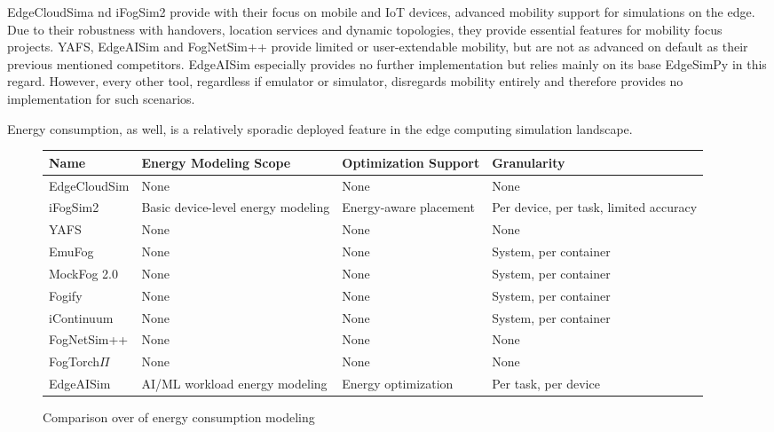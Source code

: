 EdgeCloudSima nd iFogSim2 provide with their focus on mobile and IoT devices, advanced mobility support for simulations on the edge.
Due to their robustness with handovers, location services and dynamic topologies, they provide essential features for mobility focus projects.
YAFS, EdgeAISim and FogNetSim++ provide limited or user-extendable mobility, but are not as advanced on default as their previous mentioned competitors.
EdgeAISim especially provides no further implementation but relies mainly on its base EdgeSimPy in this regard.
However, every other tool, regardless if emulator or simulator, disregards mobility entirely and therefore provides no implementation for such scenarios.

Energy consumption, as well, is a relatively sporadic deployed feature in the edge computing simulation landscape.
\begin{figure}[H]
  \centering
  \begin{tabularx}{\textwidth}{ l | X | X | X }
    \hline
    \textbf{Name} & \textbf{Energy Modeling Scope} & \textbf{Optimization Support} & \textbf{Granularity}\\
    \hline\hline
    EdgeCloudSim  & None                                & None                    & None \\\hline
    iFogSim2      & Basic device-level energy modeling  & Energy-aware placement  & Per device, per task, limited accuracy \\\hline
    YAFS          & None                                & None                    & None \\\hline
    EmuFog        & None                                & None                    & System, per container \\\hline
    MockFog 2.0   & None                                & None                    & System, per container \\\hline
    Fogify        & None                                & None                    & System, per container \\\hline
    iContinuum    & None                                & None                    & System, per container \\\hline
    FogNetSim++   & None                                & None                    & None \\\hline
    FogTorch$\Pi$ & None                                & None                    & None \\\hline
    EdgeAISim     & AI/ML workload energy modeling      & Energy optimization     & Per task, per device \\\hline
  \end{tabularx}
  \caption{Comparison over of energy consumption modeling}
  \label{tab:analysis-energy}
\end{figure}


